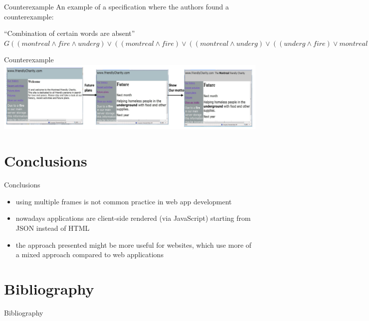 \documentclass[usenames,dvipsnames]{beamer}
\theoremstyle{definition}
\begin{document}
\begin{frame}{Counterexample}
  An example of a specification where the authors found a counterexample:

  \begin{exampleblock}{``Combination of certain words are absent''}
    \begin{math}
      G((montreal\land fire\land underg)\lor((montreal\land fire)\lor((montreal\land underg)\lor((underg\land fire)\lor montreal\lor underg\lor fire))))
    \end{math}
  \end{exampleblock}
\end{frame}

\begin{frame}{Counterexample}
  \includegraphics[width=\textwidth]{../img/counterexample.png}
\end{frame}

\section{Conclusions}

\begin{frame}{Conclusions}
  \begin{itemize}
    \item using multiple frames is not common practice in web app development
    \item nowadays applications are client-side rendered (via JavaScript) starting from JSON instead of HTML 
    \item the approach presented might be more useful for websites, which use more of a mixed approach compared to web applications
  \end{itemize}
\end{frame}

\section{Bibliography}

\begin{frame}[t,allowframebreaks]{Bibliography}
  \nocite{*} %
  \printbibliography
\end{frame}
\end{document}
